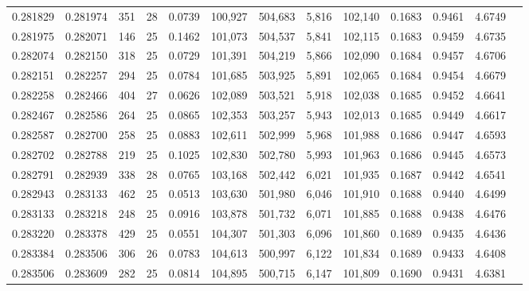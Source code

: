 \begin{tabular}{rrrrrrrrrrrrr}
0.281829 & 0.281974 &   351 &  28 &                                     0.0739 & 100,927 & 504,683 &   5,816 & 102,140 & 0.1683 & 0.9461 & 4.6749 \\
0.281975 & 0.282071 &   146 &  25 &                                     0.1462 & 101,073 & 504,537 &   5,841 & 102,115 & 0.1683 & 0.9459 & 4.6735 \\
0.282074 & 0.282150 &   318 &  25 &                                     0.0729 & 101,391 & 504,219 &   5,866 & 102,090 & 0.1684 & 0.9457 & 4.6706 \\
0.282151 & 0.282257 &   294 &  25 &                                     0.0784 & 101,685 & 503,925 &   5,891 & 102,065 & 0.1684 & 0.9454 & 4.6679 \\
0.282258 & 0.282466 &   404 &  27 &                                     0.0626 & 102,089 & 503,521 &   5,918 & 102,038 & 0.1685 & 0.9452 & 4.6641 \\
0.282467 & 0.282586 &   264 &  25 &                                     0.0865 & 102,353 & 503,257 &   5,943 & 102,013 & 0.1685 & 0.9449 & 4.6617 \\
0.282587 & 0.282700 &   258 &  25 &                                     0.0883 & 102,611 & 502,999 &   5,968 & 101,988 & 0.1686 & 0.9447 & 4.6593 \\
0.282702 & 0.282788 &   219 &  25 &                                     0.1025 & 102,830 & 502,780 &   5,993 & 101,963 & 0.1686 & 0.9445 & 4.6573 \\
0.282791 & 0.282939 &   338 &  28 &                                     0.0765 & 103,168 & 502,442 &   6,021 & 101,935 & 0.1687 & 0.9442 & 4.6541 \\
0.282943 & 0.283133 &   462 &  25 &                                     0.0513 & 103,630 & 501,980 &   6,046 & 101,910 & 0.1688 & 0.9440 & 4.6499 \\
0.283133 & 0.283218 &   248 &  25 &                                     0.0916 & 103,878 & 501,732 &   6,071 & 101,885 & 0.1688 & 0.9438 & 4.6476 \\
0.283220 & 0.283378 &   429 &  25 &                                     0.0551 & 104,307 & 501,303 &   6,096 & 101,860 & 0.1689 & 0.9435 & 4.6436 \\
0.283384 & 0.283506 &   306 &  26 &                                     0.0783 & 104,613 & 500,997 &   6,122 & 101,834 & 0.1689 & 0.9433 & 4.6408 \\
0.283506 & 0.283609 &   282 &  25 &                                     0.0814 & 104,895 & 500,715 &   6,147 & 101,809 & 0.1690 & 0.9431 & 4.6381 \\

\end{tabular}
